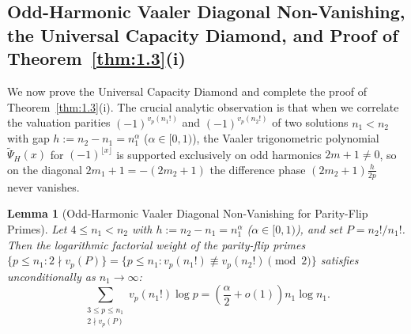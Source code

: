 \documentclass[11pt,reqno]{amsart}
\newtheorem{lemma}[theorem]{Lemma}
\theoremstyle{remark}
\numberwithin{equation}{section}
\begin{document}
\subsection{Odd-Harmonic Vaaler Diagonal Non-Vanishing, the Universal Capacity Diamond, and Proof of Theorem~\ref{thm:1.3}(i)}
We now prove the Universal Capacity Diamond and complete the proof of Theorem~\ref{thm:1.3}(i). The crucial analytic observation is that when we correlate the valuation parities $(-1)^{v_p(n_1!)}$ and $(-1)^{v_p(n_2!)}$ of two solutions $n_1 < n_2$ with gap $h := n_2 - n_1 = n_1^\alpha$ ($\alpha \in [0, 1)$), the Vaaler trigonometric polynomial $\widetilde{\Psi}_H(x)$ for $(-1)^{\lfloor x \rfloor}$ is supported exclusively on odd harmonics $2m + 1 \ne 0$, so on the diagonal $2m_1 + 1 = -(2m_2 + 1)$ the difference phase $(2m_2 + 1)\frac{h}{2p}$ never vanishes.

\begin{lemma}[{Odd-Harmonic Vaaler Diagonal Non-Vanishing for Parity-Flip Primes}]\label{lem:6.3}
Let $4 \le n_1 < n_2$ with $h := n_2 - n_1 = n_1^\alpha$ ($\alpha \in [0, 1)$), and set $P = n_2!/n_1!$. Then the logarithmic factorial weight of the parity-flip primes $\{p \le n_1 : 2 \nmid v_p(P)\} = \{p \le n_1 : v_p(n_1!) \not\equiv v_p(n_2!) \pmod 2\}$ satisfies unconditionally as $n_1 \to \infty$:
\begin{equation}\label{eq:6.7}
\sum_{\substack{3 \le p \le n_1 \\ 2 \nmid v_p(P)}} v_p(n_1!)\log p = \left(\frac{\alpha}{2} + o(1)\right)n_1\log n_1.
\end{equation}
\end{lemma}
\end{document}
